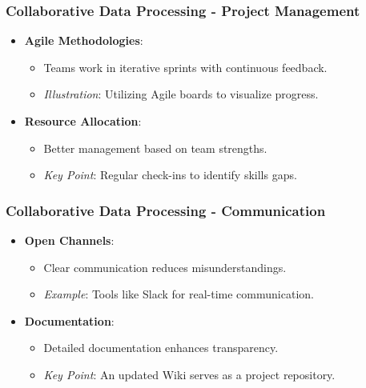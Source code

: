 \documentclass[aspectratio=169]{beamer}
\begin{document}
\begin{frame}[fragile]
    \frametitle{Collaborative Data Processing - Project Management}
    \begin{itemize}
        \item \textbf{Agile Methodologies}: 
            \begin{itemize}
                \item Teams work in iterative sprints with continuous feedback.
                \item \textit{Illustration}: Utilizing Agile boards to visualize progress.
            \end{itemize}

        \item \textbf{Resource Allocation}: 
            \begin{itemize}
                \item Better management based on team strengths.
                \item \textit{Key Point}: Regular check-ins to identify skills gaps.
            \end{itemize}
    \end{itemize}
\end{frame}

\begin{frame}[fragile]
    \frametitle{Collaborative Data Processing - Communication}
    \begin{itemize}
        \item \textbf{Open Channels}: 
            \begin{itemize}
                \item Clear communication reduces misunderstandings.
                \item \textit{Example}: Tools like Slack for real-time communication.
            \end{itemize}

        \item \textbf{Documentation}: 
            \begin{itemize}
                \item Detailed documentation enhances transparency.
                \item \textit{Key Point}: An updated Wiki serves as a project repository.
            \end{itemize}
    \end{itemize}
\end{frame}
\end{document}
